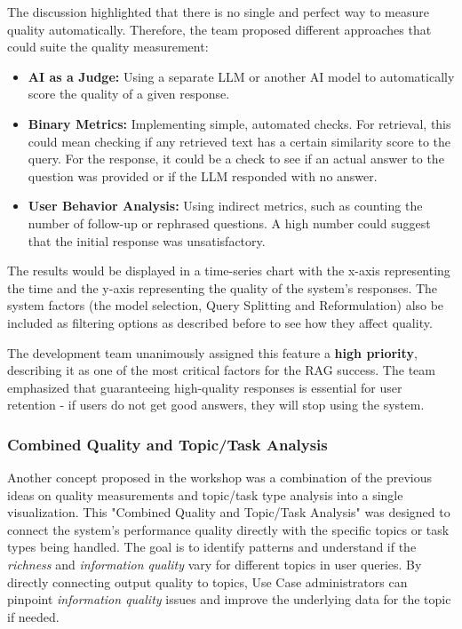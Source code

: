 \documentclass[
	english,
	ruledheaders=section,%
	class=report,%
	thesis={type=bachelor},%
	accentcolor=1b,%
	custommargins=true,%
	marginpar=false,%
	parskip=half-,%
	fontsize=11pt,%
	DIV=14,
]{tudapub}
\begin{document}
The discussion highlighted that there is no single and perfect way to measure quality automatically. Therefore, the team proposed different approaches that could suite the quality measurement:

\begin{itemize}
    \item \textbf{AI as a Judge:} Using a separate LLM or another AI model to automatically score the quality of a given response.
    \item \textbf{Binary Metrics:} Implementing simple, automated checks. For retrieval, this could mean checking if any retrieved text has a certain similarity score to the query. For the response, it could be a check to see if an actual answer to the question was provided or if the LLM responded with no answer.
    \item \textbf{User Behavior Analysis:} Using indirect metrics, such as counting the number of follow-up or rephrased questions. A high number could suggest that the initial response was unsatisfactory.
\end{itemize}

The results would be displayed in a time-series chart with the x-axis representing the time and the y-axis representing the quality of the system's responses. The system factors (the model selection, Query Splitting and Reformulation) also be included as filtering options as described before to see how they affect quality.

The development team unanimously assigned this feature a \textbf{high priority}, describing it as one of the most critical factors for the RAG success. The team emphasized that guaranteeing high-quality responses is essential for user retention - if users do not get good answers, they will stop using the system.
\subsubsection{Combined Quality and Topic/Task Analysis}
Another concept proposed in the workshop was a combination of the previous ideas on quality measurements and topic/task type analysis into a single visualization. This "Combined Quality and Topic/Task Analysis" was designed to connect the system's performance quality directly with the specific topics or task types being handled. The goal is to identify patterns and understand if the \textit{richness} and \textit{information quality} vary for different topics in user queries. By directly connecting output quality to topics, Use Case administrators can pinpoint \textit{information quality} issues and improve the underlying data for the topic if needed.
\end{document}

